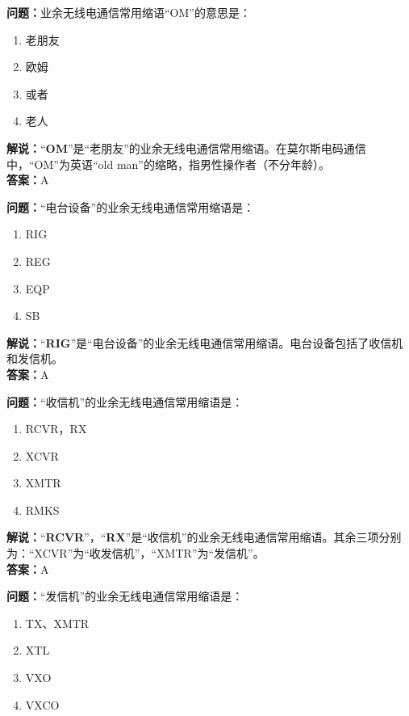 \textbf{问题：}业余无线电通信常用缩语“OM”的意思是：

\begin{enumerate}[label=\Alph*), leftmargin=1.5cm]
	\item 老朋友
	\item 欧姆
	\item 或者
	\item 老人
\end{enumerate}

\textbf{解说：}“\textbf{OM}”是“老朋友”的业余无线电通信常用缩语。在莫尔斯电码通信中，“OM”为英语“old man”的缩略，指男性操作者（不分年龄）。\\\textbf{答案：}A



\textbf{问题：}“电台设备”的业余无线电通信常用缩语是：

\begin{enumerate}[label=\Alph*), leftmargin=1.5cm]
	\item RIG
	\item REG
	\item EQP
	\item SB
\end{enumerate}

\textbf{解说：}“\textbf{RIG}”是“电台设备”的业余无线电通信常用缩语。电台设备包括了收信机和发信机。\\\textbf{答案：}A



\textbf{问题：}“收信机”的业余无线电通信常用缩语是：

\begin{enumerate}[label=\Alph*), leftmargin=1.5cm]
	\item RCVR，RX
	\item XCVR
	\item XMTR
	\item RMKS
\end{enumerate}

\textbf{解说：}“\textbf{RCVR}”，“\textbf{RX}”是“收信机”的业余无线电通信常用缩语。其余三项分别为：“XCVR”为“收发信机”，“XMTR”为“发信机”。\\\textbf{答案：}A



\textbf{问题：}“发信机”的业余无线电通信常用缩语是：

\begin{enumerate}[label=\Alph*), leftmargin=1.5cm]
	\item TX、XMTR
	\item XTL
	\item VXO
	\item VXCO
\end{enumerate}

